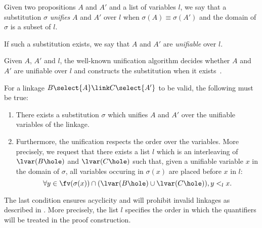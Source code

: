 \begin{definition}[Unification] Given two propositions $A$ and $A'$ and a list of variables
  $l$, we say that a substitution $\sigma$ \emph{unifies} $A$ and $A'$ over $l$
  when $\sigma(A)\equiv\sigma(A')$ and the domain of $\sigma$ is a subset of $l$. 

  If such a substitution exists, we say that $A$ and $A'$ are \emph{unifiable}
  over $l$.
\end{definition}
Given $A$, $A'$ and $l$, the well-known unification algorithm decides
whether $A$ and $A'$ are unifiable over $l$ and constructs the
substitution when it exists~.

\begin{condition}[Identity]\label{cond:unif} 
  For a linkage $B\select{A}\link C\select{A'}$ to be valid, the following must
  be true:
  \begin{enumerate}
   \item There exists a substitution $\sigma$ which unifies $A$ and
     $A'$ over the unifiable variables of the linkage.\label{clause:unif}
   \item \label{lab:cond} Furthermore, the unification respects the order over
     the variables. More precisely, we request that there exists a list $l$
     which is an interleaving of $\lvar(B\hole)$ and $\lvar(C\hole)$ such
     that, given a unifiable variable $x$ in the domain of $\sigma$, all
     variables occuring in $\sigma(x)$ are placed before $x$ in $l$:
     $$\forall y\in\fv(\sigma(x))\cap(\lvar(B\hole)\cup\lvar(C\hole)), y <_l
     x.$$\label{clause:deps}
  \end{enumerate}
\end{condition}

The last condition ensures acyclicity and will prohibit invalid
linkages as described in . More precisely,
the list $l$ specifies the order in which the quantifiers will be
treated in the proof construction.



